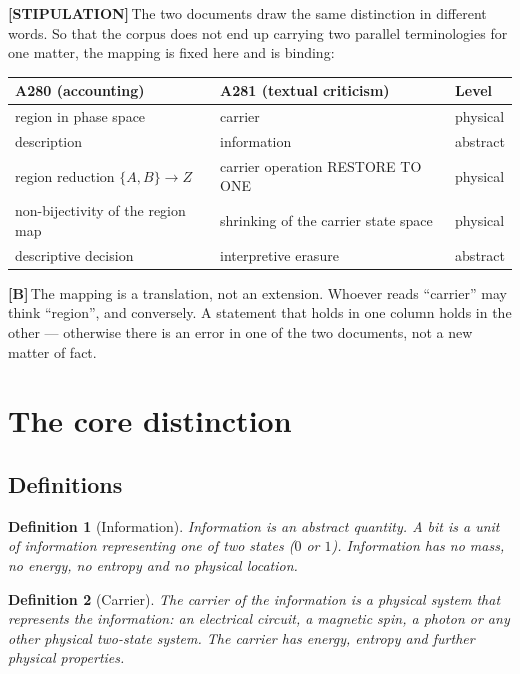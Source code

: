 \documentclass[11pt,a4paper]{article}
\newcommand{\LS}{\textcolor{laySet}{\textbf{\footnotesize\textsf{[STIPULATION]}}}\,}
\newcommand{\LB}{\textcolor{layB}{\textbf{\footnotesize\textsf{[B]}}}\,}
\theoremstyle{ffgft}
\newtheorem{definition}{Definition}
\begin{document}
\LS The two documents draw the same distinction in different words. So that the
corpus does not end up carrying two parallel terminologies for one matter, the
mapping is fixed here and is binding:

\begin{center}
\small
\begin{tabular}{@{}p{}p{}p{}@{}}
\toprule
\textbf{A280 (accounting)} & \textbf{A281 (textual criticism)} & \textbf{Level} \\
\midrule
region in phase space & carrier & physical \\
description & information & abstract \\
region reduction $\{A,B\}\to Z$ & carrier operation \textup{RESTORE TO ONE} & physical \\
non-bijectivity of the region map & shrinking of the carrier state space & physical \\
descriptive decision & interpretive erasure & abstract \\
\bottomrule
\end{tabular}
\end{center}

\LB The mapping is a translation, not an extension. Whoever reads “carrier” may
think “region”, and conversely. A statement that holds in one column holds in the
other --- otherwise there is an error in one of the two documents, not a new
matter of fact.

\section{The core distinction}

\subsection{Definitions}

\begin{definition}[Information]
Information is an abstract quantity. A bit is a unit of information representing
one of two states ($0$ or $1$). Information has no mass, no energy, no entropy and
no physical location.
\end{definition}

\begin{definition}[Carrier]
The carrier of the information is a physical system that represents the
information: an electrical circuit, a magnetic spin, a photon or any other
physical two-state system. The carrier has energy, entropy and further physical
properties.
\end{definition}
\end{document}
